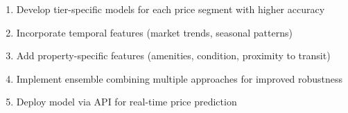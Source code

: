 \documentclass[12pt,a4paper]{article}
\begin{document}
\begin{enumerate}
    \item Develop tier-specific models for each price segment with higher accuracy
    \item Incorporate temporal features (market trends, seasonal patterns)
    \item Add property-specific features (amenities, condition, proximity to transit)
    \item Implement ensemble combining multiple approaches for improved robustness
    \item Deploy model via API for real-time price prediction
\end{enumerate}
\end{document}
